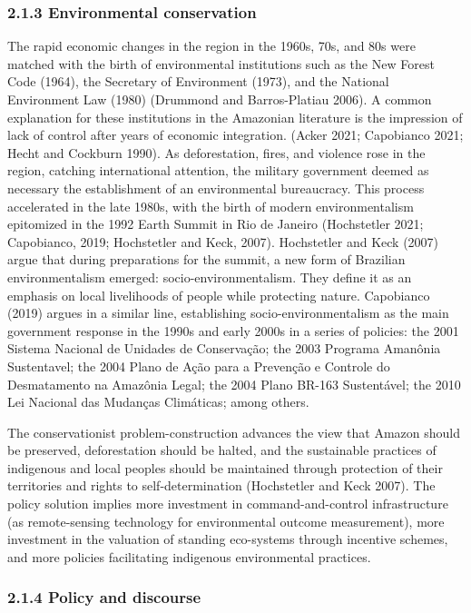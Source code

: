 \documentclass[
]{article}
\begin{document}
\hypertarget{environmental-conservation}{%
\subsubsection{2.1.3 Environmental
conservation}\label{environmental-conservation}}

The rapid economic changes in the region in the 1960s, 70s, and 80s were
matched with the birth of environmental institutions such as the New
Forest Code (1964), the Secretary of Environment (1973), and the
National Environment Law (1980) (Drummond and Barros-Platiau 2006). A
common explanation for these institutions in the Amazonian literature is
the impression of lack of control after years of economic integration.
(Acker 2021; Capobianco 2021; Hecht and Cockburn 1990). As
deforestation, fires, and violence rose in the region, catching
international attention, the military government deemed as necessary the
establishment of an environmental bureaucracy. This process accelerated
in the late 1980s, with the birth of modern environmentalism epitomized
in the 1992 Earth Summit in Rio de Janeiro (Hochstetler 2021;
Capobianco, 2019; Hochstetler and Keck, 2007). Hochstetler and Keck
(2007) argue that during preparations for the summit, a new form of
Brazilian environmentalism emerged: socio-environmentalism. They define
it as an emphasis on local livelihoods of people while protecting
nature. Capobianco (2019) argues in a similar line, establishing
socio-environmentalism as the main government response in the 1990s and
early 2000s in a series of policies: the 2001 Sistema Nacional de
Unidades de Conservação; the 2003 Programa Amanônia Sustentavel; the
2004 Plano de Ação para a Prevenção e Controle do Desmatamento na
Amazônia Legal; the 2004 Plano BR-163 Sustentável; the 2010 Lei Nacional
das Mudanças Climáticas; among others.

The conservationist problem-construction advances the view that Amazon
should be preserved, deforestation should be halted, and the sustainable
practices of indigenous and local peoples should be maintained through
protection of their territories and rights to self-determination
(Hochstetler and Keck 2007). The policy solution implies more investment
in command-and-control infrastructure (as remote-sensing technology for
environmental outcome measurement), more investment in the valuation of
standing eco-systems through incentive schemes, and more policies
facilitating indigenous environmental practices.

\hypertarget{policy-and-discourse}{%
\subsubsection{2.1.4 Policy and discourse}\label{policy-and-discourse}}
\end{document}
